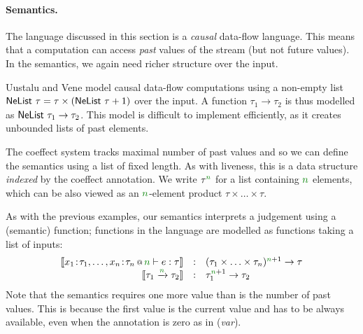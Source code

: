 \paragraph{Semantics.}
The language discussed in this section is a \emph{causal} data-flow language. This means that
a computation can access \emph{past} values of the stream (but not future values). In the semantics,
we again need richer structure over the input.

Uustalu and Vene \cite{comonads-notions} model causal data-flow computations using a non-empty list
$\ident{NeList}~\tau = \tau \times (\ident{NeList}~\tau + 1)$ over the input. A function $\tau_1 \rightarrow \tau_2$
is thus modelled as $\textnormal{\sffamily NeList}~\tau_1 \rightarrow \tau_2$. This model is difficult to implement
efficiently, as it creates unbounded lists of past elements.

The coeffect system tracks maximal number of past values and so we can define the semantics using
a list of fixed length. As with liveness, this is a data structure \emph{indexed} by the coeffect
annotation. We write $\tau^{\cclrd{n}}$ for a list containing $\cclrd{n}$ elements, which can be
also viewed as an $\cclrd{n}$-element product $\tau \times \ldots \times \tau$.

As with the previous examples, our semantics interprets a judgement using a (semantic) function;
functions in the language are modelled as functions taking a list of inputs:
%
\begin{equation*}
\begin{array}{rcl}
\sem{\coctx{x_1\!:\!\tau_1, \ldots, x_n\!:\!\tau_n}{ \cclrd{n} } \vdash e : \tau}
  &:& (\tau_1 \times \ldots \times \tau_n)^{\cclrd{n}+1} \rightarrow \tau\\
\sem{\tau_1 \xrightarrow{\cclrd{n}} \tau_2} &:& \tau_1^{\cclrd{n}+1} \rightarrow \tau_2
\end{array}
\end{equation*}
%
Note that the semantics requires one more value than is the number of past values. This is because
the first value is the current value and has to be always available, even when the annotation is
zero as in (\emph{var}).



